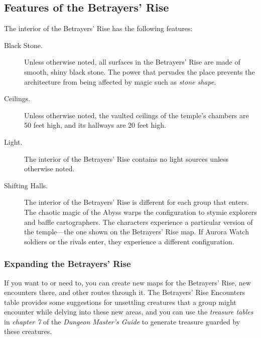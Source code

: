 \documentclass[10pt,a4paper,twoside,fancy,bg=print,twocolumn,openany,nodeprecatedcode]{dndbook}
\begin{document}
\subsection{Features of the Betrayers' Rise}
The interior of the Betrayers' Rise has the following features:


\begin{description}
\item[Black Stone.]
Unless otherwise noted, all surfaces in the Betrayers' Rise are made of smooth, shiny black stone. The power that pervades the place prevents the architecture from being affected by magic such as \textit{stone shape}.
\item[Ceilings.]
Unless otherwise noted, the vaulted ceilings of the temple's chambers are 50 feet high, and its hallways are 20 feet high.
\item[Light.]
The interior of the Betrayers' Rise contains no light sources unless otherwise noted.
\item[Shifting Halls.]
The interior of the Betrayers' Rise is different for each group that enters. The chaotic magic of the Abyss warps the configuration to stymie explorers and baffle cartographers. The characters experience a particular version of the temple—the one shown on the Betrayers' Rise map. If Aurora Watch soldiers or the rivals enter, they experience a different configuration.
\end{description}

\subsubsection{Expanding the Betrayers' Rise}
If you want to or need to, you can create new maps for the Betrayers' Rise, new encounters there, and other routes through it. The Betrayers' Rise Encounters table provides some suggestions for unsettling creatures that a group might encounter while delving into these new areas, and you can use the \textit{treasure tables} in \textit{chapter 7} of the \textit{Dungeon Master's Guide} to generate treasure guarded by these creatures.
\end{document}
